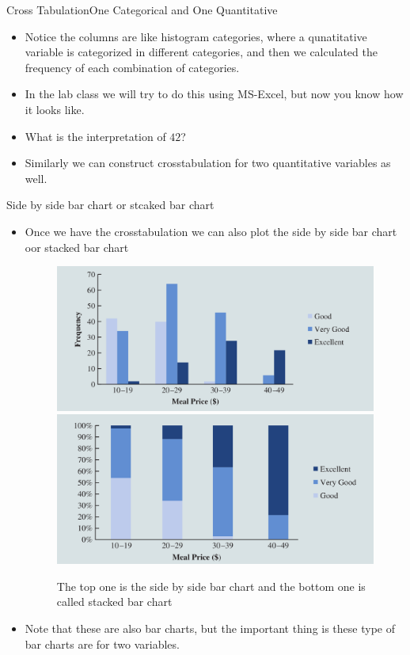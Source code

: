 \documentclass[8pt, usepdftitle=false]{beamer}
\begin{document}
\begin{frame}[allowframebreaks]{Cross Tabulation}{One Categorical and One Quantitative}
\begin{itemize}
\item Notice the columns are like histogram categories, where a qunatitative variable is categorized in different categories, and then we calculated the frequency of each combination of categories.


\item In the lab class we will try to do this using MS-Excel, but now you know how it looks like.

\item What is the interpretation of $42$?

\item Similarly we can construct crosstabulation for two quantitative variables as well.


\end{itemize}

\end{frame}  

\begin{frame}[allowframebreaks]{Side by side bar chart or stcaked bar chart}
  
\begin{itemize}
  \item Once we have the crosstabulation we can also plot the side by side bar chart oor stacked bar chart


  \begin{figure}
  \includegraphics[scale = .203]{Images/barchart_sidebyside.png}  
  \includegraphics[scale = .21]{Images/barchart_stacked.png}
  \caption{The top one is the side by side bar chart and the bottom one is called stacked bar chart}
  \end{figure}

  \item Note that these are also bar charts, but the important thing is these type of bar charts are for two variables.

\end{itemize}
\end{frame}
\end{document}
